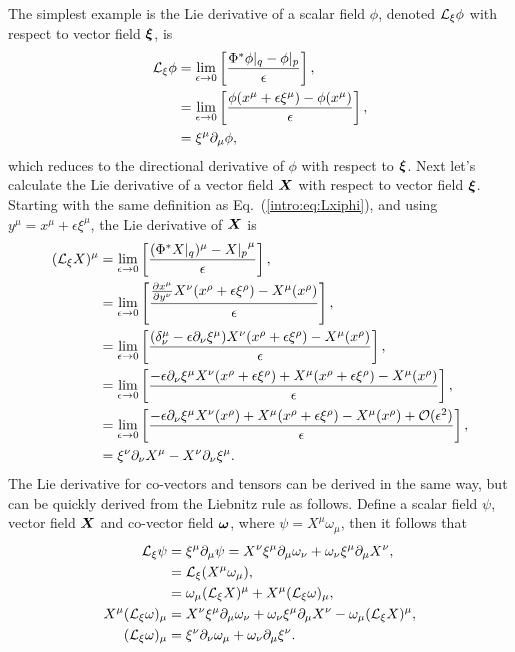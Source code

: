 The simplest example is the Lie derivative of a scalar field $\phi$, denoted $\mathcal{L}_\xi \phi$ with respect to vector field $\boldsymbol \xi$, is
\begin{align} \label{intro:eq:Lxiphi}
\mathcal{L}_\xi \phi &= \lim_{\epsilon \rightarrow 0}\left[\frac{\Phi^*\phi\vert_q - \phi\vert_p}{\epsilon} \right] , \\
&= \lim_{\epsilon \rightarrow 0}\left[\frac{\phi(x^\mu + \epsilon \xi^\mu) - \phi(x^\mu)}{\epsilon} \right] , \\
&= \xi^\mu \partial_\mu \phi,
\end{align}
which reduces to the directional derivative of $\phi$ with respect to $\boldsymbol{\xi}$. Next let's calculate the Lie derivative of a vector field $\boldsymbol{X}$ with respect to vector field $\boldsymbol\xi$. Starting with the same definition as Eq.~(\ref{intro:eq:Lxiphi}), and using $y^\mu = x^\mu + \epsilon \xi^\mu$, the Lie derivative of $\boldsymbol X$ is 
\begin{align} 
(\mathcal{L}_\xi {X})^\mu &= \lim_{\epsilon \rightarrow 0}\left[\frac{(\Phi^*X\vert_q)^\mu - {X\vert_p}^\mu}{\epsilon} \right] , \\
&= \lim_{\epsilon \rightarrow 0}\left[\frac{ \frac{\partial x^\mu}{\partial y^\nu}X^\nu(x^\rho + \epsilon \xi^\rho) - X^\mu(x^\rho)}{\epsilon} \right] , \\
&= \lim_{\epsilon \rightarrow 0}\left[\frac{ (\delta_\nu^\mu - \epsilon \partial_\nu \xi^\mu)X^\nu(x^\rho + \epsilon \xi^\rho) - X^\mu(x^\rho)}{\epsilon} \right] , \\
&= \lim_{\epsilon \rightarrow 0}\left[\frac{ - \epsilon \partial_\nu \xi^\mu X^\nu(x^\rho + \epsilon \xi^\rho)+ X^\mu(x^\rho + \epsilon \xi^\rho) - X^\mu(x^\rho)}{\epsilon}  \right] , \\
&= \lim_{\epsilon \rightarrow 0}\left[\frac{ - \epsilon \partial_\nu \xi^\mu X^\nu(x^\rho)+ X^\mu(x^\rho + \epsilon \xi^\rho) - X^\mu(x^\rho)+\mathcal{O}(\epsilon^2)}{\epsilon}  \right] , \\
&= \xi^\nu \partial_\nu X^\mu - X^\nu \partial_\nu \xi^\mu.
\end{align}
The Lie derivative for co-vectors and tensors can be derived in the same way, but can be quickly derived from the Liebnitz rule as follows. Define a scalar field $\psi$, vector field $\boldsymbol{X}$ and co-vector field $\boldsymbol\omega$, where $\psi = X^\mu \omega_\mu$, then it follows that
\begin{align}
\mathcal{L}_\xi \psi &= \xi^\mu \partial_\mu \psi =  X^\nu\xi^\mu\partial_\mu\omega_\nu+\omega_\nu\xi^\mu\partial_\mu X^\nu, \\
              &= \mathcal{L}_\xi (X^\mu \omega_\mu),\\
              &= \omega_\mu (\mathcal{L}_\xi X)^\mu + X^\mu(\mathcal{L}_\xi\omega)_\mu,\\
               X^\mu(\mathcal{L}_\xi \omega)_\mu & =X^\nu\xi^\mu\partial_\mu\omega_\nu+\omega_\nu\xi^\mu\partial_\mu X^\nu-\omega_\mu (\mathcal{L}_\xi X)^\mu, \\
               (\mathcal{L}_\xi \omega)_\mu&= \xi^\nu \partial_\nu \omega_\mu + \omega_\nu \partial_\mu \xi^\nu.
\end{align}
